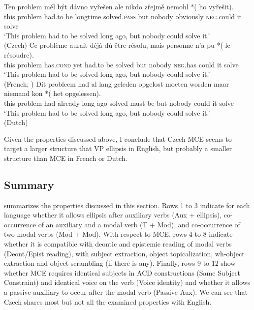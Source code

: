 \documentclass[output=paper,colorlinks,citecolor=brown,
modfonts
]{langscibook}
\begin{document}
\begin{exe}
\ex \label{30}
\begin{xlist}
\ex \label{30a} 
\gll Ten problem měl být dávno vyřešen ale nikdo zřejmě nemohl *(\hspace{-2pt} ho vyřešit).\\
this problem had.to be longtime solved.\textsc{pass} but nobody obviously \textsc{neg}.could  {} it solve\\
\glt `This problem had to be solved long ago, but nobody could solve it.' \\ \hfill (Czech)
\ex \label{30b}
\gll Ce problème aurait déjà dû être résolu, mais personne n'a pu *(\hspace{-2pt} le résoudre).\\
this problem has.\textsc{cond} yet had.to be solved but nobody \textsc{neg}.has could  {} it solve\\
\glt `This problem had to be solved long ago, but nobody could solve it.' \\ \hfill (French; \citealt{Dagnac2010})
\ex \label{30c}
\gll  Dit probleem had al lang geleden opgelost moeten worden maar niemand  kon *(\hspace{-2pt} het opgelessen). \\
 this problem  had already long ago solved must be but nobody could {} it solve\\
\glt `This problem had to be solved long ago, but nobody could solve it.' \\  \hfill (Dutch) \\
\end{xlist}
\end{exe}

\noindent Given the properties discussed above, I conclude that Czech MCE seems to target a larger structure that VP ellipsis in English, but probably a smaller structure than MCE in French or Dutch. 

\subsection{Summary} \label{sec:4.3}

 summarizes the properties discussed in this section. Rows 1 to 3 indicate for each language whether it allows ellipsis after auxiliary verbs (Aux + ellipsis), co-occurrence of an auxiliary and a modal verb (T + Mod), and co-occurrence of two modal verbs (Mod + Mod). With respect to MCE, rows 4 to 8 indicate whether it is compatible with deontic and epistemic reading of modal verbs (Deont/Epist reading), with subject extraction, object topicalization, wh-object extraction and object scrambling (if there is any). Finally, rows 9 to 12 show whether MCE requires identical subjects in ACD constructions (Same Subject Constraint) and identical voice on the verb (Voice identity) and whether it allows a passive auxiliary to occur after the modal verb (Passive Aux). We can see that Czech shares most but not all the examined properties with English. 
\end{document}
